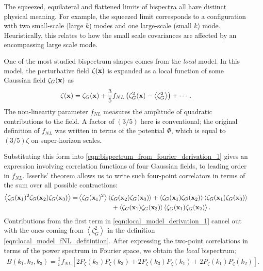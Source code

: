The squeezed, equilateral and flattened limits of bispectra all have distinct physical meaning. For example, the squeezed limit corresponds to a configuration with two small-scale (large $k$) modes and one large-scale (small $k$) mode. Heuristically, this relates to how the small scale covariances are affected by an encompassing large scale mode.

One of the most studied bispectrum shapes comes from the \textit{local} model. In this model, the perturbative field $\zeta(\mathbf{x})$ is expanded as a local function of some Gaussian field $\zeta_G(\mathbf{x})$ as
\begin{align}
	\zeta(\mathbf{x}) = \zeta_G(\mathbf{x}) + \frac{3}{5} f_{NL} \left(\zeta_G^2(\mathbf{x}) - \left< \zeta_G^2 \right> \right) + \cdots. \label{eqn:local_model_fNL_defitintion}
\end{align}
The non-linearity parameter $f_{NL}$ measures the amplitude of quadratic contributions to the field. A factor of $(3/5)$ here is conventional; the original definition of $f_{NL}$ was written in terms of the potential $\Phi$, which is equal to $(3/5)\zeta$ on super-horizon scales.

Substituting this form into \eqref{eqn:bispectrum_from_fourier_derivation_1} gives an expression involving correlation functions of four Gaussian fields, to leading order in $f_{NL}$. Isserlis' theorem allows us to write such four-point correlators in terms of the sum over all possible contractions:
\begin{align}
	\left< \zeta_G(\vv{x}_1)^2 \zeta_G(\vv{x}_2) \zeta_G(\vv{x}_3) \right> = &\left< \zeta_G(\vv{x}_1)^2 \right> \left< \zeta_G(\vv{x}_2) \zeta_G(\vv{x}_3) \right> + \left< \zeta_G(\vv{x}_1) \zeta_G(\vv{x}_2) \right> \left< \zeta_G(\vv{x}_1) \zeta_G(\vv{x}_3) \right> \nonumber \\ &\hspace{0.15\textwidth} + \left< \zeta_G(\vv{x}_1) \zeta_G(\vv{x}_3) \right> \left< \zeta_G(\vv{x}_1) \zeta_G(\vv{x}_2) \right>. \label{eqn:local_model_derivation_1}
\end{align}
Contributions from the first term in \eqref{eqn:local_model_derivation_1} cancel out with the ones coming from $\left< \zeta_G^2 \right>$ in the definition \eqref{eqn:local_model_fNL_defitintion}. After expressing the two-point correlations in terms of the power spectrum in Fourier space, we obtain the \textit{local} bispectrum;
\begin{align}
	B(k_1, k_2, k_3) = \frac{3}{5} f_{NL} \left[ 2P_\zeta(k_2) P_\zeta(k_3) + 2P_\zeta(k_3) P_\zeta(k_1) + 2P_\zeta(k_1) P_\zeta(k_2) \right]. \label{eqn:local_bispectrum_using_power_spectrum}
\end{align}

